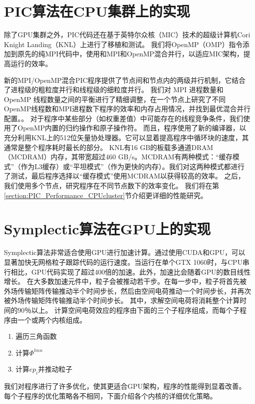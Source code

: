\section{PIC算法在CPU集群上的实现}        \label{section:PIC_Code_CPUcluster}
除了GPU集群之外，PIC代码还在基于英特尔众核（MIC）技术的超级计算机Cori Knight Landing（KNL）上进行了移植和测试。
我们将OpenMP（OMP）指令添加到原先的纯MPI代码中，使用和MPI和OpenMP混合并行，以适应MIC架构，提高运行的效率。

新的MPI/OpenMP混合PIC程序提供了节点间和节点内的两级并行机制，它结合了进程级的粗粒度并行和线程级的细粒度并行。
我们对 MPI 进程数量和 OpenMP 线程数量之间的平衡进行了精细调整，在一个节点上研究了不同OpenMP线程数和MPI进程数下程序的效率和内存占用情况，并找到最优混合并行配置。。
对于程序中某些部分（如权重差值）中可能存在的线程竞争条件，我们使用了OpenMP内置的归约操作和原子操作符。 
而且，程序使用了新的编译器，以充分利用KNL上的512位矢量协处理器。它可以显着提高程序中循环块的速度，其通常是整个程序耗时最长的部分。
KNL有16 GB的板载多通道DRAM（MCDRAM）内存，其带宽超过460 GB/s。MCDRAM有两种模式：“缓存模式”（作为L3缓存）或“平坦模式”（作为更快的内存）。我们对这两种模式都进行了测试，最后程序选择以“缓存模式”使用MCDRAM以获得较高的效率。
之后，我们使用多个节点，研究程序在不同节点数下的效率变化。
我们将在第\ref{section:PIC_Performance_CPUcluster}节介绍更详细的性能研究。

\section{Symplectic算法在GPU上的实现}     \label{section:symplectic_GPU}
Symplectic算法非常适合使用GPU进行加速计算。通过使用CUDA和GPU，可以显著加快无网格粒子跟踪代码的运行速度。当运行在单个GTX 1060时，与CPU串行相比，GPU代码实现了超过400倍的加速。此外，加速比会随着GPU的数目线性增长。
在大多数加速元件中，粒子会被推动若干步。在每一步中，粒子将首先被外场传输矩阵传输推动半个时间步长，然后由空间电荷推动一个时间步长，并再次被外场传输矩阵传输推动半个时间步长。
其中，求解空间电荷将消耗整个计算时间的90％以上。 计算空间电荷效应的程序由下面的三个子程序组成，而每个子程序由一个或两个内核组成。
\begin{enumerate}
  \item 遍历三角函数
  \item 计算$\Phi^{lmn}$
  \item 计算$ep_i$并推动粒子
\end{enumerate}

我们对程序进行了许多优化，使其更适合GPU架构，程序的性能得到显着改善。 每个子程序的优化策略各不相同，下面介绍各个内核的详细优化策略。
